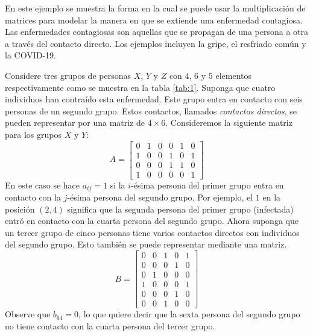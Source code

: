 \begin{example}
    En este ejemplo se muestra la forma en la cual se puede usar la multiplicación de matrices para modelar la manera en que se extiende una enfermedad contagiosa. Las enfermedades contagiosas son aquellas que se propagan de una persona a otra a través del contacto directo. Los ejemplos incluyen la gripe, el resfriado común y la COVID-19.
    
    Considere tres grupos de personas $X$, $Y$ y $Z$ con $4$, $6$ y $5$ elementos respectivamente como se muestra en la tabla \ref{tab:1}. Suponga que cuatro individuos han contraído esta enfermedad. Este grupo entra en contacto con seis personas de un segundo grupo. Estos contactos, llamados \textit{contactos directos}, se pueden representar por una matriz de $4 \times 6$. Consideremos la siguiente matriz para los grupos $X$ y $Y$:
    $$A = \begin{bmatrix}
        0 & 1 & 0 & 0 & 1 & 0 \\
        1 & 0 & 0 & 1 & 0 & 1 \\
        0 & 0 & 0 & 1 & 1 & 0 \\
        1 & 0 & 0 & 0 & 0 & 1
    \end{bmatrix}$$
    En este caso se hace $a_{ij} = 1$ si la $i$-ésima persona del primer grupo entra en contacto con la $j$-ésima persona del segundo grupo. Por ejemplo, el $1$ en la posición $(2, 4)$ significa que la segunda persona del primer grupo (infectada) entró en contacto con la cuarta persona del segundo grupo. Ahora suponga que un tercer grupo de cinco personas tiene varios contactos directos con individuos del segundo grupo. Esto también se puede representar mediante una matriz.
    $$B = \begin{bmatrix}
        0 & 0 & 1 & 0 & 1 \\
        0 & 0 & 0 & 1 & 0 \\
        0 & 1 & 0 & 0 & 0 \\
        1 & 0 & 0 & 0 & 1 \\
        0 & 0 & 0 & 1 & 0 \\
        0 & 0 & 1 & 0 & 0
    \end{bmatrix}$$
    Observe que $b_{64} = 0$, lo que quiere decir que la sexta persona del segundo grupo no tiene contacto con la cuarta persona del tercer grupo.
    

\end{example}
